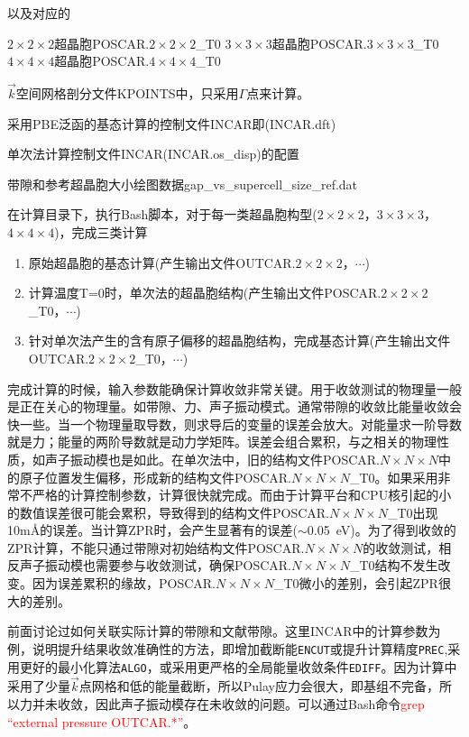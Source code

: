 {以及对应的

$2\times2\times2$超晶胞\textrm{POSCAR.$2\times2\times2$\_T0}
$3\times3\times3$超晶胞\textrm{POSCAR.$3\times3\times3$\_T0}
$4\times4\times4$超晶胞\textrm{POSCAR.$4\times4\times4$\_T0}

$\vec k$空间网格剖分文件\textrm{KPOINTS}中，只采用$\Gamma$点来计算。

采用\textrm{PBE}泛函的基态计算的控制文件\textrm{INCAR}即\textrm{(INCAR.dft)}

单次法计算控制文件\textrm{INCAR}\textrm{(INCAR.os\_disp)}的配置

带隙和参考超晶胞大小绘图数据\textrm{gap\_vs\_supercell\_size\_ref.dat}

在计算目录下，执行\textrm{Bash}脚本，对于每一类超晶胞构型($2\times2\times2$，$3\times3\times3$，$4\times4\times4$)，完成三类计算
\begin{enumerate}
	\item 原始超晶胞的基态计算(产生输出文件\textrm{OUTCAR.$2\times2\times2$}，$\cdots$)
	\item 计算温度\textrm{T=0}时，单次法的超晶胞结构(产生输出文件\textrm{POSCAR.$2\times2\times2$\_T0}，$\cdots$)
	\item 针对单次法产生的含有原子偏移的超晶胞结构，完成基态计算(产生输出文件\textrm{OUTCAR.$2\times2\times2$\_T0}，$\cdots$)
\end{enumerate}

完成计算的时候，输入参数能确保计算收敛非常关键。用于收敛测试的物理量一般是正在关心的物理量。如带隙、力、声子振动模式。通常带隙的收敛比能量收敛会快一些。当一个物理量取导数，则求导后的变量的误差会放大。对能量求一阶导数就是力；能量的两阶导数就是动力学矩阵。误差会组合累积，与之相关的物理性质，如声子振动模也是如此。在单次法中，旧的结构文件\textrm{POSCAR.$N\times N\times N$}中的原子位置发生偏移，形成新的结构文件\textrm{POSCAR.$N\times N\times N$\_T0}。如果采用非常不严格的计算控制参数，计算很快就完成。而由于计算平台和\textrm{CPU}核引起的小的数值误差很可能会累积，导致得到的结构文件\textrm{POSCAR.$N\times N\times N$\_T0}出现\textrm{10m\AA}的误差。当计算\textrm{ZPR}时，会产生显著有的误差\textrm{($\sim$0.05~eV)}。为了得到收敛的\textrm{ZPR}计算，不能只通过带隙对初始结构文件\textrm{POSCAR.$N\times N\times N$}的收敛测试，相反声子振动模也需要参与收敛测试，确保\textrm{POSCAR.$N\times N\times N$\_T0}结构不发生改变。因为误差累积的缘故，\textrm{POSCAR.$N\times N\times N$\_T0}微小的差别，会引起\textrm{ZPR}很大的差别。

前面讨论过如何关联实际计算的带隙和文献带隙。这里\textrm{INCAR}中的计算参数为例，说明提升结果收敛准确性的方法，即增加截断能\texttt{ENCUT}或提升计算精度\texttt{PREC},采用更好的最小化算法\texttt{ALGO}，或采用更严格的全局能量收敛条件\texttt{EDIFF}。因为计算中采用了少量$\vec k$点网格和低的能量截断，所以\textrm{Pulay}应力会很大，即基组不完备，所以力并未收敛，因此声子振动模存在未收敛的问题。可以通过\textrm{Bash}命令\textcolor{red}{\textrm{grep ``external pressure OUTCAR.*''}}。

}
